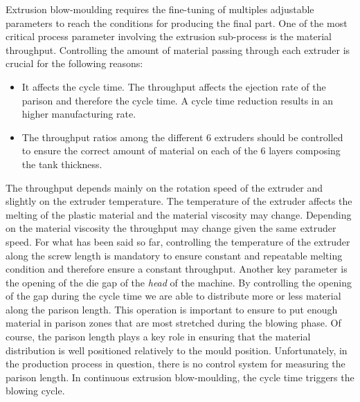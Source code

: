 Extrusion blow-moulding requires the fine-tuning of multiples adjustable parameters to reach the conditions for producing the final part. One of the most critical process parameter involving the extrusion sub-process is the material throughput. Controlling the amount of material passing through each extruder is crucial for the following reasons:  
%
\begin{itemize}
    \item It affects the cycle time. The throughput affects the ejection rate of the parison and therefore the cycle time. A cycle time reduction results in an higher manufacturing rate.
    \item The throughput ratios among the different 6 extruders should be controlled to ensure the correct amount of material on each of the 6 layers composing the tank thickness.
\end{itemize}
%
The throughput depends mainly on the rotation speed of the extruder and slightly on the extruder temperature. The temperature of the extruder affects the melting of the plastic material and the material viscosity may change. Depending on the material viscosity the throughput may change given the same extruder speed. For what has been said so far, controlling the temperature of the extruder along the screw length is mandatory to ensure constant and repeatable melting condition and therefore ensure a constant throughput. Another key parameter is the opening of the die gap of the \textit{head} of the machine. By controlling the opening of the gap during the cycle time we are able to distribute more or less material along the parison length. This operation is important to ensure to put enough material in parison zones that are most stretched during the blowing phase. Of course, the parison length plays a key role in ensuring that the material distribution is well positioned relatively to the mould position. Unfortunately, in the production process in question, there is no control system for measuring the parison length. In continuous extrusion blow-moulding, the cycle time triggers the blowing cycle. 


